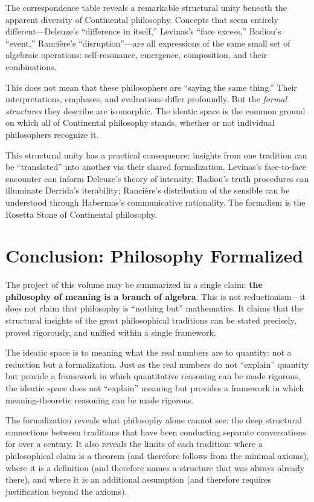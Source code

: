\begin{remark}
The correspondence table reveals a remarkable structural unity beneath the
apparent diversity of Continental philosophy. Concepts that seem
entirely different---Deleuze's ``difference in itself,'' Levinas's ``face
excess,'' Badiou's ``event,'' Rancière's ``disruption''---are all
expressions of the same small set of algebraic operations: self-resonance,
emergence, composition, and their combinations.

This does not mean that these philosophers are ``saying the same thing.''
Their interpretations, emphases, and evaluations differ profoundly.
But the \emph{formal structures} they describe are isomorphic. The ideatic
space is the common ground on which all of Continental philosophy stands,
whether or not individual philosophers recognize it.

This structural unity has a practical consequence: insights from one
tradition can be ``translated'' into another via their shared formalization.
Levinas's face-to-face encounter can inform Deleuze's theory of intensity;
Badiou's truth procedures can illuminate Derrida's iterability; Rancière's
distribution of the sensible can be understood through Habermas's communicative
rationality. The formalism is the Rosetta Stone of Continental philosophy.
\end{remark}

\section{Conclusion: Philosophy Formalized}

The project of this volume may be summarized in a single claim:
\textbf{the philosophy of meaning is a branch of algebra}. This is not
reductionism---it does not claim that philosophy is ``nothing but'' mathematics.
It claims that the structural insights of the great philosophical traditions can
be stated precisely, proved rigorously, and unified within a single framework.

The ideatic space is to meaning what the real numbers are to quantity: not a
reduction but a formalization. Just as the real numbers do not ``explain''
quantity but provide a framework in which quantitative reasoning can be made
rigorous, the ideatic space does not ``explain'' meaning but provides a
framework in which meaning-theoretic reasoning can be made rigorous.

The formalization reveals what philosophy alone cannot see: the deep structural
connections between traditions that have been conducting separate conversations
for over a century. It also reveals the limits of each tradition: where a
philosophical claim is a theorem (and therefore follows from the minimal axioms),
where it is a definition (and therefore names a structure that was always
already there), and where it is an additional assumption (and therefore requires
justification beyond the axioms).

